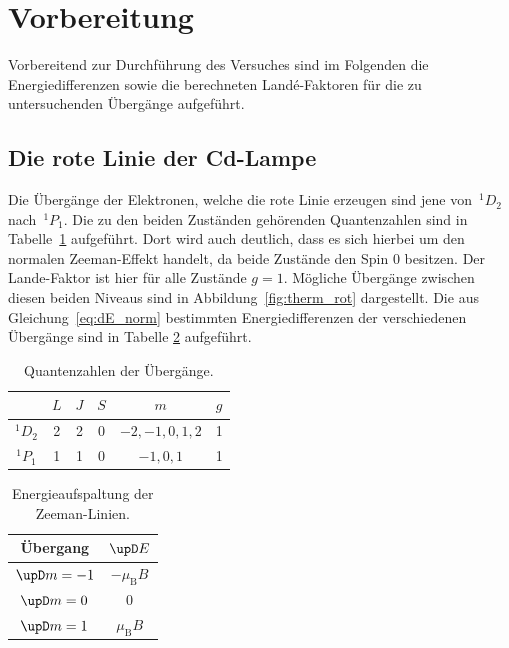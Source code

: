 \section{Vorbereitung}
\label{sec:vorbereitung}
Vorbereitend zur Durchführung des Versuches sind im Folgenden die Energiedifferenzen
sowie die berechneten Landé-Faktoren für die zu untersuchenden Übergänge aufgeführt.

\subsection{Die rote Linie der Cd-Lampe}
Die Übergänge der Elektronen, welche die rote Linie erzeugen sind jene von~$^{1}D_2$
nach~$^{1}P_1$. Die zu den beiden Zuständen gehörenden Quantenzahlen sind in
Tabelle~\ref{tab:rot_cd} aufgeführt. Dort wird auch deutlich, dass es sich hierbei
um den normalen Zeeman-Effekt handelt, da beide Zustände den Spin $0$ besitzen. Der
Lande-Faktor ist hier für alle Zustände $g=1$. Mögliche Übergänge zwischen diesen
beiden Niveaus sind in Abbildung~\ref{fig:therm_rot} dargestellt. Die aus
Gleichung~\eqref{eq:dE_norm} bestimmten Energiedifferenzen der verschiedenen
Übergänge sind in Tabelle \ref{tab:rot_cdE} aufgeführt.
%
%
\begin{table}[H]
    \centering
    \caption{Quantenzahlen der Übergänge.}
    \begin{tabular}{cccccc}
        \toprule
    {} & {$L$}  & {$J$}  & {$S$} & {$m$} & {$g$} \\
		\midrule
	  $^{1}D_2$ & 2 & 2 & 0 & $-2,-1,0,1,2$ & 1 \\
    $^{1}P_1$ & 1 & 1 & 0 & $-1,0,1$ & 1 \\
    \bottomrule
	\end{tabular}
    \label{tab:rot_cd}
\end{table}
%
\begin{table}[H]
    \centering
    \caption{Energieaufspaltung der Zeeman-Linien.}
    \begin{tabular}{cc}
        \toprule
    {Übergang} & {$\upD E$} \\
		\midrule
	  $\upD m=-1$ & $-\mu_{\mathup{B}}B$ \\
    $\upD m=0$ & 0 \\
    $\upD m=1$ & $\mu_{\mathup{B}}B$ \\
    \bottomrule
	\end{tabular}
    \label{tab:rot_cdE}
\end{table}
%
